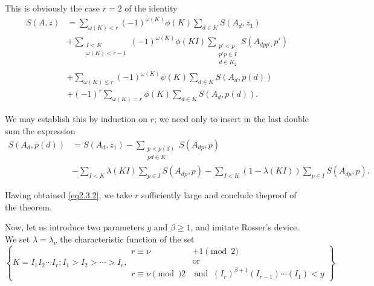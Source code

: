 This is obviously the case $r = 2$ of the identity
\begin{align*}
S(A,z) & = \sum_{\omega (K) < r} (-1)^{\omega(K)} \phi(K) \sum_{d \in
  K} S(A_d, z_1) \\  
& + \sum_{\substack{ I < K  \\ \omega(K)< r-1}} (-1)^{\omega(K)}
\phi(KI) \sum_{\substack{ p'< p  \\ p'p \in I \\ d \in K_2}}
S(A_{dpp',}p') \tag{2.3.2}\label{eq2.3.2}\\ 
& + \sum_{\omega (K) \le r} (-1)^{\omega(K)} \psi(K) \sum_{d \in K} S(A_d,p(d)) \\
& + (-1)^r \sum_{\omega (K) = r} \phi (K) \sum_{d \in K}  S(A_d,p(d)).
\end{align*}

We may establish this by induction on $r$; we need only to insert in
the last double sum the expression 
\begin{align*}
S(A_d,p(d)) & = S(A_d,  z_1) - \sum_{\substack{ p < p(d)  \\ pd \in
    K}} S(A_{dp}, p) \\ 
& - \sum_{I < K} \lambda(KI) \sum_{p \in I} S(A_{dp},p) - \sum_{I < K
} (1 - \lambda (KI)) \sum_{p \in I} S(A_{dp},p). 
\end{align*}

Having obtained \eqref{eq2.3.2}, we take $r$ sufficiently large and conclude
the\pageoriginale proof of the theorem. 

Now, let us introduce two parameters $y$ and $\beta \ge 1$, and
imitate Rosser's device. We set $\lambda = \lambda_\nu$ the
characteristic function of the set  
{\fontsize{9pt}{11pt}\selectfont
\begin{equation*}
  \left \{
  K = I_1 I_2 \cdots I_r ; I_1 > I_2 > \cdots > I_r, 
  \begin{aligned}
    r \equiv \nu &+ 1 \pmod{2} \\ 
    & \text{or} \\ 
    r \equiv \nu \pmod{} 2 &~\text{and }~ (I_r)^{\beta + 1} (I_{r -1}) 
    \cdots(I_1) < y  
  \end{aligned}
  \right \} \tag{2.3.3}\label{eq2.3.3}
\end{equation*}}\relax

